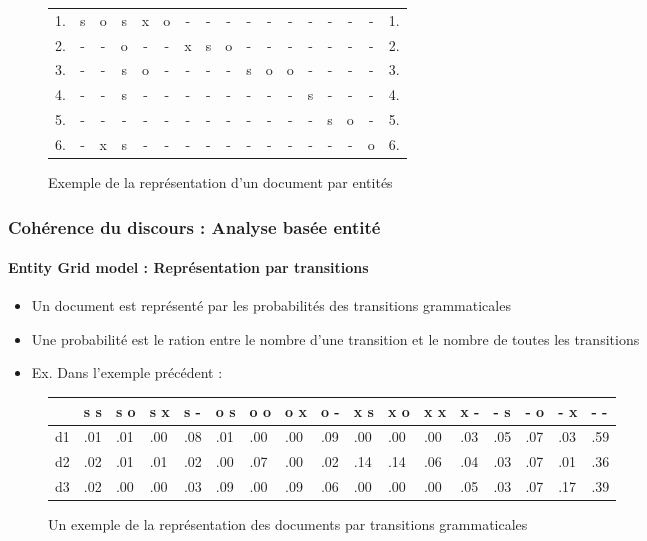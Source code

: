 \documentclass[xcolor=table]{beamer}
\begin{document}
\begin{frame}
\begin{figure}
\begin{tabular}{ccccccccccccccccc}
			1. & s & o & s & x & o & - & - & - & - & - & - & - & - & - & - & 1. \\
			2. & - & - & o & - & - & x & s & o & - & - & - & - & - & - & - & 2. \\
			3. & - & - & s & o & - & - & - & - & s & o & o & - & - & - & - & 3. \\
			4. & - & - & s & - & - & - & - & - & - & - & - & s & - & - & - & 4. \\
			5. & - & - & - & - & - & - & - & - & - & - & - & - & s & o & - & 5. \\
			6. & - & x & s & - & - & - & - & - & - & - & - & - & - & - & o & 6. \\
			
		\end{tabular}
		\caption{Exemple de la représentation d'un document par entités \cite{2008-barzilay-lapata}}
	\end{figure}


%		
	
\end{frame}

\begin{frame}
	\frametitle{Cohérence du discours : Analyse basée entité}
	\framesubtitle{Entity Grid model : Représentation par transitions}
	
	\begin{itemize}
		\item Un document est représenté par les probabilités des transitions grammaticales
		\item Une probabilité est le ration entre le nombre d'une transition et le nombre de toutes les transitions
		\item Ex. Dans l'exemple précédent : 
	\end{itemize}
	\begin{figure}
		\tiny\bfseries
		\begin{tabular}{lllllllllllllllll}
			\hline
			& s s & s o & s x & s - & o s & o o & o x & o - & x s & x o & x x & x - & - s & - o & - x & - - \\
			\hline
			d1 & .01 & .01 & .00 & .08 & .01 & .00 & .00 & .09 & .00 & .00 & .00 & .03 & .05 & .07 & .03 & .59 \\
			d2 & .02 & .01 & .01 & .02 & .00 & .07 & .00 & .02 & .14 & .14 & .06 & .04 & .03 & .07 & .01 & .36 \\
			d3 & .02 & .00 & .00 & .03 & .09 & .00 & .09 & .06 & .00 & .00 & .00 & .05 & .03 & .07 & .17 & .39 \\
			\hline
		\end{tabular}
		\caption{Un exemple de la représentation des documents par transitions grammaticales \cite{2008-barzilay-lapata}}
	\end{figure}
	
\end{frame}
\end{document}
